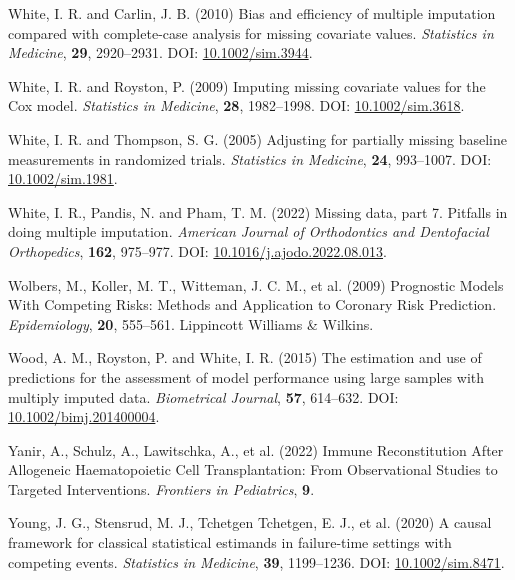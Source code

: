 \documentclass[
  letterpaper,
  DIV=11,
  numbers=noendperiod]{scrreprt}
\newlength{\cslhangindent}
\newenvironment{CSLReferences}[2] %
 {\begin{list}{}{%
  \setlength{\itemindent}{0pt}
  \setlength{\leftmargin}{0pt}
  \setlength{\parsep}{0pt}
  \ifodd #1
   \setlength{\leftmargin}{\cslhangindent}
   \setlength{\itemindent}{-1\cslhangindent}
  \fi
  \setlength{\itemsep}{#2\baselineskip}}}
 {\end{list}}
\begin{document}
\begin{CSLReferences}{1}{1}
White, I. R. and Carlin, J. B. (2010) Bias and efficiency of multiple
imputation compared with complete-case analysis for missing covariate
values. \emph{Statistics in Medicine}, \textbf{29}, 2920--2931. DOI:
\href{https://doi.org/10.1002/sim.3944}{10.1002/sim.3944}.

White, I. R. and Royston, P. (2009) Imputing missing covariate values
for the {Cox} model. \emph{Statistics in Medicine}, \textbf{28},
1982--1998. DOI:
\href{https://doi.org/10.1002/sim.3618}{10.1002/sim.3618}.

White, I. R. and Thompson, S. G. (2005) Adjusting for partially missing
baseline measurements in randomized trials. \emph{Statistics in
Medicine}, \textbf{24}, 993--1007. DOI:
\href{https://doi.org/10.1002/sim.1981}{10.1002/sim.1981}.

White, I. R., Pandis, N. and Pham, T. M. (2022) Missing data, part 7.
{Pitfalls} in doing multiple imputation. \emph{American Journal of
Orthodontics and Dentofacial Orthopedics}, \textbf{162}, 975--977. DOI:
\href{https://doi.org/10.1016/j.ajodo.2022.08.013}{10.1016/j.ajodo.2022.08.013}.

Wolbers, M., Koller, M. T., Witteman, J. C. M., et al. (2009) Prognostic
{Models With Competing Risks}: {Methods} and {Application} to {Coronary
Risk Prediction}. \emph{Epidemiology}, \textbf{20}, 555--561. Lippincott
Williams \& Wilkins.

Wood, A. M., Royston, P. and White, I. R. (2015) The estimation and use
of predictions for the assessment of model performance using large
samples with multiply imputed data. \emph{Biometrical Journal},
\textbf{57}, 614--632. DOI:
\href{https://doi.org/10.1002/bimj.201400004}{10.1002/bimj.201400004}.

Yanir, A., Schulz, A., Lawitschka, A., et al. (2022) Immune
{Reconstitution After Allogeneic Haematopoietic Cell Transplantation}:
{From Observational Studies} to {Targeted Interventions}.
\emph{Frontiers in Pediatrics}, \textbf{9}.

Young, J. G., Stensrud, M. J., Tchetgen Tchetgen, E. J., et al. (2020) A
causal framework for classical statistical estimands in failure-time
settings with competing events. \emph{Statistics in Medicine},
\textbf{39}, 1199--1236. DOI:
\href{https://doi.org/10.1002/sim.8471}{10.1002/sim.8471}.


\end{CSLReferences}
\end{document}
